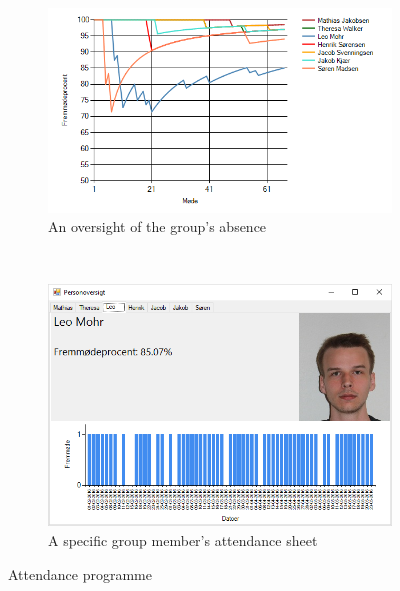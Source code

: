 \begin{figure}
    \centering
    \begin{subfigure}[b]{0.6\textwidth}
        \includegraphics[width=1\textwidth]{figures/GraphImage.png}
		\caption{An oversight of the group's absence}
		\label{fig:GraphImage}
    \end{subfigure}
    ~ %
    \begin{subfigure}[b]{0.35\textwidth}
        \includegraphics[width=1\textwidth]{figures/soerenfravaer.png}
		\caption{A specific group member's attendance sheet}
		\label{fig:soerenfravaer}
    \end{subfigure}
    \caption{Attendance programme}\label{fig:attendance}
\end{figure}


\begin{figure}
	\centering
	
\end{figure}

